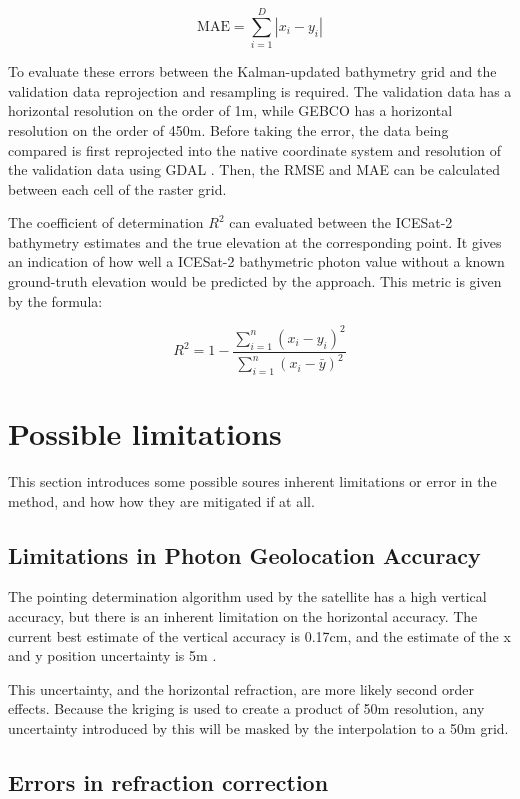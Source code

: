 $$ \text{MAE} = \sum_{i=1}^{D}|x_i-y_i| $$

To evaluate these errors between the Kalman-updated bathymetry grid and the validation data reprojection and resampling is required. The validation data has a horizontal resolution on the order of 1m, while GEBCO has a horizontal resolution on the order of 450m. Before taking the error, the data being compared is first reprojected into the native coordinate system and resolution of the validation data using GDAL \parencite{rouault_even_2022_6352176}. Then, the RMSE and MAE can be calculated between each cell of the raster grid.

The coefficient of determination $R^2$ can evaluated between the ICESat-2 bathymetry estimates and the true elevation at the corresponding point. It gives an indication of how well a ICESat-2 bathymetric photon value without a known ground-truth elevation would be predicted by the approach. This metric is given by the formula:

\begin{equation}
    R^2 = 1 - \frac{\sum_{i=1}^{n} (x_i - y_i)^2}{\sum_{i=1}^{n} (x_i - \bar{y})^2}
\end{equation}


\section{Possible limitations}

This section introduces some possible soures inherent limitations or error in the method, and how how they are mitigated if at all.

\subsection{Limitations in Photon Geolocation Accuracy}

The pointing determination algorithm used by the satellite has a high vertical accuracy, but there is an inherent limitation on the horizontal accuracy. The current best estimate of the vertical accuracy is 0.17cm, and the estimate of the x and y position uncertainty is 5m \parencite{Neumann2019c}.

This uncertainty, and the horizontal refraction, are more likely second order effects. Because the kriging is used to create a product of 50m resolution, any uncertainty introduced by this will be masked by the interpolation to a 50m grid.

\subsection{Errors in refraction correction}

